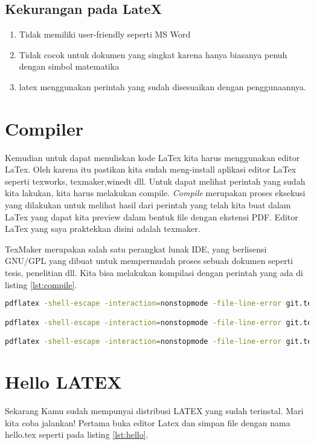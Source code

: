 \subsection{Kekurangan pada LateX}
\begin{enumerate}
\item Tidak memiliki user-friendly seperti MS Word
\item Tidak cocok untuk dokumen yang singkat karena hanya biasanya penuh dengan simbol matematika
\item latex menggunakan perintah yang sudah disesuaikan dengan penggunaannya.
\end{enumerate}

\section{Compiler}
Kemudian untuk dapat menuliskan kode LaTex kita harus menggunakan editor LaTex. Oleh karena itu pastikan kita sudah meng-install aplikasi editor LaTex seperti texworks, texmaker,winedt dll. Untuk dapat melihat perintah yang sudah kita lakukan, kita harus melakukan compile. \textit{Compile} merupakan proses eksekusi yang dilakukan untuk melihat hasil dari perintah yang telah kita buat dalam LaTex yang dapat kita preview dalam bentuk file dengan ekstensi PDF. Editor LaTex yang saya praktekkan disini adalah texmaker.


TexMaker merupakan salah satu perangkat lunak IDE, yang berlisensi GNU/GPL yang dibuat untuk mempermudah proses sebuah dokumen seperti tesis, penelitian dll. Kita bisa melakukan kompilasi dengan perintah yang ada di listing \ref{lst:compile}.

\begin{lstlisting}[caption=Perintah kompilasi latex keluaran pdf,label={lst:compile},language=sh]
pdflatex -shell-escape -interaction=nonstopmode -file-line-error git.tex | grep ".*:[0-9]*:.*|LaTeX Warning:"

pdflatex -shell-escape -interaction=nonstopmode -file-line-error git.tex | grep ".*:[0-9]*:.*"

pdflatex -shell-escape -interaction=nonstopmode -file-line-error git.tex | grep -i ".*:[0-9]*:.*\|warning"
\end{lstlisting} 

\section{Hello LATEX}
Sekarang Kamu sudah mempunyai distribusi LATEX yang sudah terinstal. Mari kita coba jalankan! Pertama buka editor Latex dan simpan file dengan nama hello.tex seperti pada listing \ref{lst:hello}.
\cite{kline2018latex}
